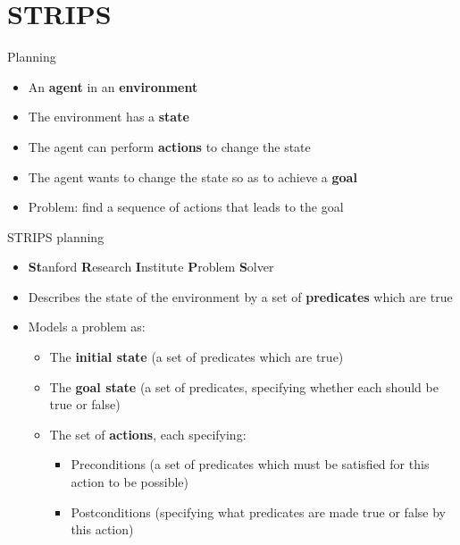\part{STRIPS}
\frame{\partpage}

\begin{frame}{Planning}
	\begin{itemize}
		\pause\item An \textbf{agent} in an \textbf{environment}
		\pause\item The environment has a \textbf{state}
		\pause\item The agent can perform \textbf{actions} to change the state
		\pause\item The agent wants to change the state so as to achieve a \textbf{goal}
		\pause\item Problem: find a sequence of actions that leads to the goal
	\end{itemize}
\end{frame}

\begin{frame}{STRIPS planning}
	\begin{itemize}
		\pause\item \textbf{St}anford \textbf{R}esearch \textbf{I}nstitute \textbf{P}roblem \textbf{S}olver
		\pause\item Describes the state of the environment by a set of \textbf{predicates} which are true
		\pause\item Models a problem as:
			\begin{itemize}
				\pause\item The \textbf{initial state} (a set of predicates which are true)
				\pause\item The \textbf{goal state} (a set of predicates, specifying whether each should be true or false)
				\pause\item The set of \textbf{actions}, each specifying:
					\begin{itemize}
						\pause\item Preconditions (a set of predicates which must be satisfied for this action to be possible) 
						\pause\item Postconditions (specifying what predicates are made true or false by this action)
					\end{itemize}
			\end{itemize}
	\end{itemize}
\end{frame}

